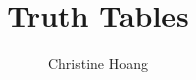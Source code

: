 \documentclass{article}
\title{Truth Tables}
\author{Christine Hoang}
\begin{document}
\maketitle

\section{}
\end{document}
